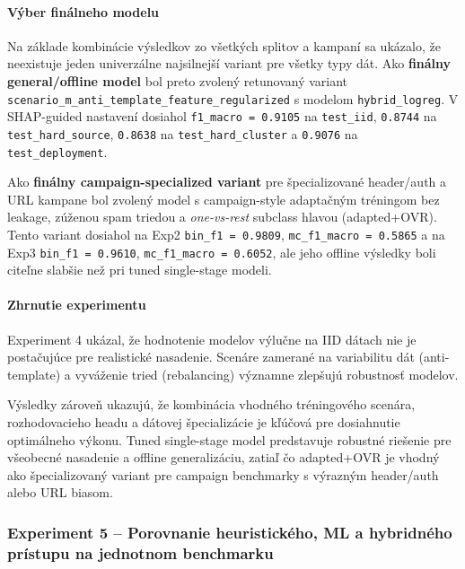 \documentclass[conference]{IEEEtran}
\begin{document}
\paragraph{Výber finálneho modelu}

Na základe kombinácie výsledkov zo všetkých splitov a kampaní sa ukázalo,
že neexistuje jeden univerzálne najsilnejší variant pre všetky typy dát.
Ako \textbf{finálny general/offline model} bol preto zvolený retunovaný
variant \texttt{scenario\_m\_anti\_template\_feature\_regularized}
s modelom \texttt{hybrid\_logreg}. V SHAP-guided nastavení dosiahol
\texttt{f1\_macro = 0.9105} na \texttt{test\_iid},
\texttt{0.8744} na \texttt{test\_hard\_source},
\texttt{0.8638} na \texttt{test\_hard\_cluster} a
\texttt{0.9076} na \texttt{test\_deployment}.

Ako \textbf{finálny campaign-specialized variant} pre špecializované
header/auth a URL kampane bol zvolený model s campaign-style adaptačným
tréningom bez leakage, zúženou spam triedou a \textit{one-vs-rest}
subclass hlavou (adapted+OVR). Tento variant dosiahol na Exp2
\texttt{bin\_f1 = 0.9809}, \texttt{mc\_f1\_macro = 0.5865} a na Exp3
\texttt{bin\_f1 = 0.9610}, \texttt{mc\_f1\_macro = 0.6052}, ale jeho
offline výsledky boli citeľne slabšie než pri tuned single-stage modeli.

\paragraph{Zhrnutie experimentu}

Experiment 4 ukázal, že hodnotenie modelov výlučne na IID dátach
nie je postačujúce pre realistické nasadenie. Scenáre zamerané
na variabilitu dát (anti-template) a vyváženie tried (rebalancing)
významne zlepšujú robustnosť modelov.

Výsledky zároveň ukazujú, že kombinácia vhodného tréningového
scenára, rozhodovacieho headu a dátovej špecializácie je kľúčová
pre dosiahnutie optimálneho výkonu. Tuned single-stage model predstavuje
robustné riešenie pre všeobecné nasadenie a offline generalizáciu,
zatiaľ čo adapted+OVR je vhodný ako špecializovaný variant pre
campaign benchmarky s výrazným header/auth alebo URL biasom.

\subsubsection{Experiment 5 – Porovnanie heuristického, ML a hybridného prístupu na jednotnom benchmarku}\label{exp5}
\end{document}
